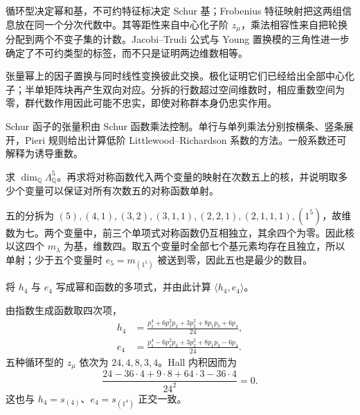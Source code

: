 




\begin{chaptersummary}
	循环型决定幂和基，不可约特征标决定 Schur 基；Frobenius 特征映射把这两组信息放在同一个分次代数中。其等距性来自中心化子阶 \(z_\mu\)，乘法相容性来自把轮换分配到两个不变子集的计数。Jacobi--Trudi 公式与 Young 置换模的三角性进一步确定了不可约类型的标签，而不只是证明两边维数相等。

	\ProseParagraphBreak
	张量幂上的因子置换与同时线性变换彼此交换。极化证明它们已经给出全部中心化子；半单矩阵块再产生双向对应。分拆的行数超过空间维数时，相应重数空间为零，群代数作用因此可能不忠实，即使对称群本身仍忠实作用。

	\ProseParagraphBreak
	Schur 函子的张量积由 Schur 函数乘法控制。单行与单列乘法分别按横条、竖条展开，Pieri 规则给出计算低阶 Littlewood--Richardson 系数的方法。一般系数还可解释为诱导重数。
\end{chaptersummary}

\BookExercises

\begin{exercise}\label{b5:ex:07-stable-specialization}
	求 \(\dim_{\mathbb Q}\Lambda_{\mathbb Q}^5\)。再求将对称函数代入两个变量的映射在次数五上的核，并说明取多少个变量可以保证对所有次数五的对称函数单射。
\end{exercise}
\begin{solution}
	五的分拆为 \((5),(4,1),(3,2),(3,1,1),(2,2,1),(2,1,1,1),(1^5)\)，故维数为七。两个变量中，前三个单项式对称函数仍互相独立，其余四个为零。因此核以这四个 \(m_\lambda\) 为基，维数四。取五个变量时全部七个基元素均存在且独立，所以单射；少于五个变量时 \(e_5=m_{(1^5)}\) 被送到零，因此五也是最少的数目。
\end{solution}

\begin{exercise}\label{b5:ex:07-degree-four-generators}
	将 \(h_4\) 与 \(e_4\) 写成幂和函数的多项式，并由此计算 \(\langle h_4,e_4\rangle\)。
\end{exercise}
\begin{solution}
	由指数生成函数取四次项，
	\begin{align*}
		h_4&=\frac{p_1^4+6p_1^2p_2+3p_2^2+8p_1p_3+6p_4}{24},\\
		e_4&=\frac{p_1^4-6p_1^2p_2+3p_2^2+8p_1p_3-6p_4}{24}.
	\end{align*}
	五种循环型的 \(z_\mu\) 依次为 \(24,4,8,3,4\)。Hall 内积因而为
	\[
		\frac{24-36\cdot4+9\cdot8+64\cdot3-36\cdot4}{24^2}=0.
	\]
	这也与 \(h_4=s_{(4)}\)、\(e_4=s_{(1^4)}\) 正交一致。
\end{solution}

